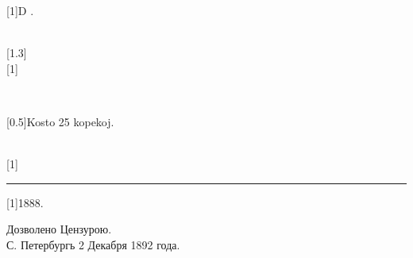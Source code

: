 \documentclass[ngerman,12pt,twoside]{book}
\begin{document}
\sloppy
\begin{titlepage}

\newlength{\tempparskip}
\setlength{\tempparskip}{\parskip}
\setlength{\parskip}{2ex}

\vspace*{\fill}

\begin{center}

\scalebox{0.8}[1]{\latin\huge D .}

\\[3ex]

\scalebox{1.3}[1.3]{\latino{\Huge{%
\scalebox{2}[2]{D}\thinspace{}\scalebox{1.3}[1]{UA}~%
\scalebox{2}[2]{L}\thinspace{}\thinspace{}\scalebox{1.3}[1]{IBRO}}}}\\[4ex]

\scalebox{1.5}[1]{}\\[4ex]


\\[3ex]

\kajerobox


\scalebox{1}[0.5]{\LARGE Kosto 25 kopekoj.}

\\[3ex]

\scalebox{0.7}[1]{\Large {}}

\rule[1ex]{3em}{0.4pt}

\scalebox{1.5}[1]{{\large 1888.}}

\end{center}

\vspace*{\fill}

\setlength{\parskip}{\tempparskip}
\end{titlepage}

%
%
\renewcommand{\footrulewidth}{0.4pt}

\vspace*{12em}

\begin{table}[h]
\begin{center}
{\large Дозволено Цензурою. \\
\vspace{1ex}
С. Петербургь 2 Декабря 1892 года.}
\end{center}

\end{table}
\end{document}
